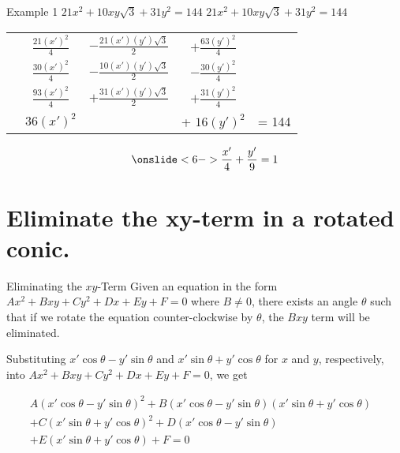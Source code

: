 \documentclass[t,usenames,dvipsnames]{beamer}
\begin{document}
\begin{frame}{Example 1 \quad $21x^2 + 10xy\sqrt{3} + 31y^2 = 144$}
$21x^2 + 10xy\sqrt{3} + 31y^2 = 144$    \newline\\
\setlength{\extrarowheight}{6pt}
\begin{tabular}{ccccc}
    \onslide<2->{& $\frac{21(x')^2}{4}$ &  $- \frac{21(x')(y')\sqrt{3}}{2}$ & $+ \frac{63(y')^2}{4}$ &  }\\[12pt]
    \onslide<3->{& $\frac{30(x')^2}{4}$ &  $- \frac{10(x')(y')\sqrt{3}}{2}$ & $-\frac{30(y')^2}{4}$ & }\\[12pt]
    \onslide<4->{+& $\frac{93(x')^2}{4}$ & $+ \frac{31(x')(y')\sqrt{3}}{2}$ & $ + \frac{31(y')^2}{4}$ \\[12pt]    \hline}
    \onslide<5->{& $36(x')^2$ & & + $16(y')^2$ & = 144 }\\
\end{tabular}
\[  \onslide<6->{\frac{x'}{4} + \frac{y'}{9} = 1}
\]
\end{frame}

\section{Eliminate the xy-term in a rotated conic.}

\begin{frame}{Eliminating the $xy$-Term}
Given an equation in the form $Ax^2 + Bxy + Cy^2 + Dx + Ey + F = 0$ where $B \neq 0$, there exists an angle $\theta$ such that if we rotate the equation counter-clockwise by $\theta$, the $Bxy$ term will be eliminated.  \newline\\   \pause

Substituting $x'\cos \theta - y'\sin \theta$ and $x'\sin\theta + y'\cos\theta$ for $x$ and $y$, respectively, into $Ax^2 + Bxy + Cy^2 + Dx + Ey + F = 0$, we get \pause

\begin{equation*}
\begin{split}
A(x'\cos\theta - y'\sin\theta)^2 + B(x'\cos\theta-y'\sin\theta)(x'\sin\theta + y'\cos\theta)   &\\ + C(x'\sin\theta + y'\cos\theta)^2 + D(x'\cos\theta - y'\sin\theta)  &\\  + E(x'\sin\theta + y'\cos\theta) + F = 0
\end{split}
\end{equation*}
\end{frame}
\end{document}
